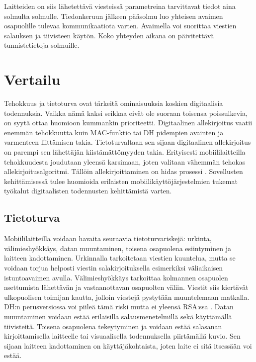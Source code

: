 \documentclass[finnish]{tktltiki2}
\theoremstyle{definition}
\theoremstyle{remark}
\begin{document}
Laitteiden on siis lähetettävä viesteissä parametreina tarvittavat tiedot aina solmulta solmulle. Tiedonkeruun jälkeen pääsolmu luo yhteisen avaimen osapuolille tulevaa kommunikaatiota varten. Avaimella voi suorittaa viestien salauksen ja tiivisteen käytön. Koko yhteyden aikana on päivitettävä tunnistetietoja solmuille.

\section{Vertailu}

Tehokkuus ja tietoturva ovat tärkeitä ominaisuuksia koskien digitaalisia todennuksia. Vaikka nämä kaksi seikkaa eivät ole suoraan toisensa poissulkevia, on syytä ottaa huomioon kummankin prioriteetti. Digitaalinen allekirjoitus vaatii enemmän tehokkuutta kuin MAC-funktio tai DH pidempien avainten ja varmenteen liittämisen takia. Tietoturvaltaan sen sijaan digitaalinen allekirjoitus on parempi sen lähettäjän kiistämättömyyden takia. Erityisesti mobiililaitteilla tehokkuudesta joudutaan yleensä karsimaan, joten valitaan vähemmän tehokas allekirjoitusalgoritmi. Tällöin allekirjoittaminen on hidas prosessi \cite{proxy}. Sovellusten kehittämisessä tulee huomioida erilaisten mobiilikäyttöjärjestelmien tukemat työkalut digitaalisten todennusten kehittämistä varten.

\subsection{Tietoturva}

Mobiililaitteilla voidaan havaita seuraavia tietoturvariskejä: urkinta, välimieshyökkäys, datan muuntaminen, toisena osapuolena esiintyminen ja laitteen kadottaminen. Urkinnalla tarkoitetaan viestien kuuntelua, mutta se voidaan torjua helposti viestin salakirjoituksella esimerkiksi väliaikaisen istuntoavaimen avulla. Välimieshyökkäys tarkoittaa kolmannen osapuolen asettumista lähettävän ja vastaanottavan osapuolten väliin. Viestit siis kiertävät ulkopuolisen toimijan kautta, jolloin viestejä pystytään muuntelemaan matkalla. DH:n perusversiossa voi piileä tämä riski mutta ei yleensä RSA:ssa \cite{enti}. Datan muuntaminen voidaan estää erilaisilla salausmenetelmillä sekä käyttämällä tiivisteitä. Toisena osapuolena tekeytyminen ja voidaan estää salasanan kirjoittamisella laitteelle tai visuaalisella todennuksella piirtämällä kuvio. Sen sijaan laitteen kadottaminen on käyttäjäkohtaista, joten laite ei sitä itsessään voi estää.
\end{document}
